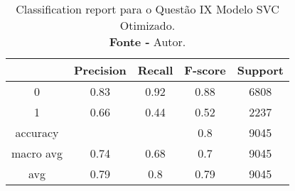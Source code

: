 % 
\begin{table}[H]
    \centering
    \begin{tabular}{@{}ccccc@{}}
    \toprule
     & \textbf{Precision} & \textbf{Recall} &\textbf{F-score} & \textbf{Support} \\ \midrule 
    0 & 0.83 & 0.92 & 0.88 & 6808 \\ 
    1 & 0.66 & 0.44 & 0.52 & 2237 \\ 
    accuracy &  &  & 0.8 & 9045 \\ 
    macro avg & 0.74 & 0.68 & 0.7 & 9045 \\ 
    avg & 0.79 & 0.8 & 0.79 & 9045 \\ \bottomrule 
    \end{tabular}
    \caption{Classification report para o Questão IX Modelo SVC Otimizado. \\ \textbf{Fonte -} Autor.}
    \label{tab: classification-report-Questão IX Modelo SVC Otimizado}
\end{table}